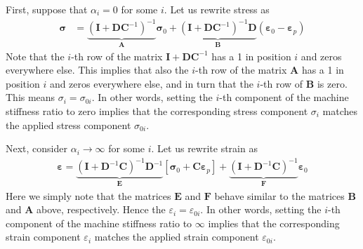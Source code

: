 First, suppose that $\alpha_i=0$ for some $i$. Let us rewrite stress as
\begin{align}
\bm \sigma&=\underbrace{\left(\bm I+\bm D\bm C^{-1}\right)^{-1}}_{\bm A}\bm \sigma_0+\underbrace{\left(\bm I+\bm D\bm C^{-1}\right)^{-1}\bm D}_{\bm B}\left(\bm \varepsilon_0- \bm\varepsilon_p\right)
\end{align}
 Note that the $i$-th row of the matrix $\bm I+\bm D\bm C^{-1}$ has a 1 in position $i$ and zeros everywhere else. This implies that also the $i$-th row of the matrix $\bm A$ has a 1 in position $i$ and zeros everywhere else, and in turn that  the $i$-th row of $\bm B$ is zero. This means $\sigma_{i}= \sigma_{0i}$. In other words, setting the $i$-th component of the machine stiffness ratio to zero implies that the corresponding stress component $\sigma_{i}$  matches the applied stress component $\sigma_{0i}$.

Next, consider $\alpha_i\rightarrow\infty$ for some $i$. Let us rewrite strain as
\begin{align}
\bm \varepsilon=\underbrace{\left(\bm I+\bm D^{-1}\bm C\right)^{-1}\bm D^{-1}}_{\bm E} \left[\bm \sigma_0+\bm C\bm\varepsilon_p\right]
+\underbrace{\left(\bm I+\bm D^{-1}\bm C\right)^{-1}}_{\bm F} \bm \varepsilon_0
\end{align}
Here we simply note that the matrices $\bm E$ and $\bm F$ behave similar to the matrices $\bm B$ and $\bm A$ above, respectively. Hence the  $\varepsilon_{i}= \varepsilon_{0i}$. In other words, setting the $i$-th component of the machine stiffness ratio to $\infty$ implies that the corresponding strain component $\varepsilon_{i}$  matches the applied strain component $\varepsilon_{0i}$.





